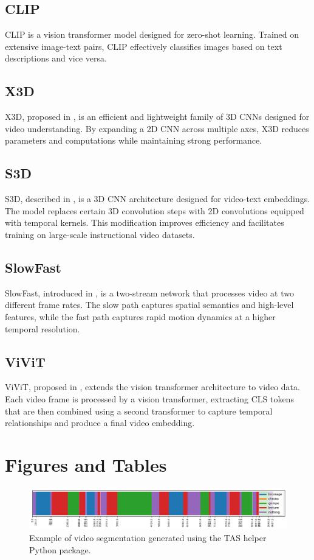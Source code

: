 \subsection*{CLIP}
CLIP is a vision transformer model designed for zero-shot learning. Trained on extensive image-text pairs, CLIP effectively classifies images based on text descriptions and vice versa.

\subsection*{X3D}
X3D, proposed in \cite{x3d}, is an efficient and lightweight family of 3D CNNs designed for video understanding. By expanding a 2D CNN across multiple axes, X3D reduces parameters and computations while maintaining strong performance.

\subsection*{S3D}
S3D, described in \cite{s3d}, is a 3D CNN architecture designed for video-text embeddings. The model replaces certain 3D convolution steps with 2D convolutions equipped with temporal kernels. This modification improves efficiency and facilitates training on large-scale instructional video datasets.

\subsection*{SlowFast}
SlowFast, introduced in \cite{slowfast}, is a two-stream network that processes video at two different frame rates. The slow path captures spatial semantics and high-level features, while the fast path captures rapid motion dynamics at a higher temporal resolution.

\subsection*{ViViT}
ViViT, proposed in \cite{vivit}, extends the vision transformer architecture to video data. Each video frame is processed by a vision transformer, extracting CLS tokens that are then combined using a second transformer to capture temporal relationships and produce a final video embedding.

\section{Figures and Tables}



\begin{figure}[!h]
    \centering
    \includegraphics[width=1\linewidth]{../../assets/figures/example-of-video-segmentation-1.png}
    \caption{Example of video segmentation generated using the TAS helper Python package.}
    \label{fig:your-label}
\end{figure}